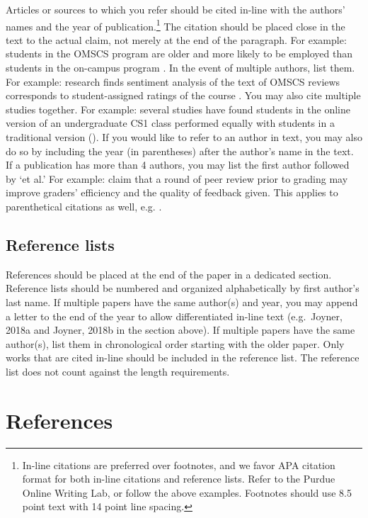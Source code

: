 \documentclass{jdf}
\begin{document}
Articles or sources to which you refer should be cited in-line with the
authors' names and the year of publication.\footnote{In-line citations
  are preferred over footnotes, and we favor APA citation format for
  both in-line citations and reference lists. Refer to the Purdue Online
  Writing Lab, or follow the above examples. Footnotes should use 8.5
  point text with 14 point line spacing.} The citation should be placed
close in the text to the actual claim, not merely at the end of the
paragraph. For example: students in the OMSCS program are older and more
likely to be employed than students in the on-campus program
\autocite{joyner2017}. In the event of multiple authors, list them. For
example: research finds sentiment analysis of the text of OMSCS reviews
corresponds to student-assigned ratings of the course
\autocite{newman2018}. You may also cite multiple studies together. For
example: several studies have found students in the online version of an
undergraduate CS1 class performed equally with students in a traditional
version (\autocite{joyner2018a,joyner2018b}). If you would like to refer
to an author in text, you may also do so by including the year (in
parentheses) after the author's name in the text. If a publication has
more than 4 authors, you may list the first author followed by `et al.'
For example: \autocite{joyner2016} claim that a round of peer review
prior to grading may improve graders' efficiency and the quality of
feedback given. This applies to parenthetical citations as well, e.g.
\autocite{joyner2016}.

\hypertarget{reference-lists}{%
\subsection{Reference lists}\label{reference-lists}}

References should be placed at the end of the paper in a dedicated
section. Reference lists should be numbered and organized alphabetically
by first author's last name. If multiple papers have the same author(s)
and year, you may append a letter to the end of the year to allow
differentiated in-line text (e.g.~Joyner, 2018a and Joyner, 2018b in the
section above). If multiple papers have the same author(s), list them in
chronological order starting with the older paper. Only works that are
cited in-line should be included in the reference list. The reference
list does not count against the length requirements.

\hypertarget{references}{%
\section{References}\label{references}}
\end{document}
